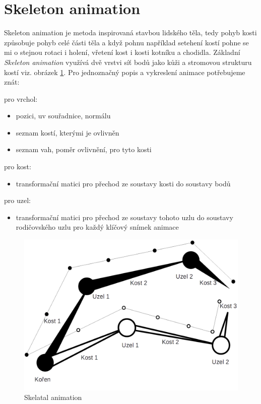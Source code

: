 \section{Skeleton animation}\label{SA}
Skeleton animation je metoda inspirovaná stavbou lidského těla, tedy pohyb kosti způsobuje pohyb celé části těla a když pohnu například setehení kostí pohne se mi o stejnou rotaci i holení, vřetení kost i kosti kotníku a chodidla. Základní \emph{Skeleton animation} využívá dvě vrstvi síť bodů jako kůži a stromovou strukturu kostí viz. obrázek \ref{skeletalAnimation}. Pro jednoznačný popis a vykreslení animace potřebujeme znát:
\begin{itemize}
	\begin{item}
		pro vrchol:
			\begin{itemize}			
			\item pozici, uv souřadnice, normálu
			\item seznam kostí, kterými je ovlivněn
			\item seznam vah, poměr ovlivnění, pro tyto kosti
		\end{itemize}
	\end{item}
	\begin{item}
	pro kost:
	\begin{itemize}
		\item transformační matici pro přechod ze soustavy kosti do soustavy bodů
	\end{itemize}

\end{item}
	\begin{item}
	pro uzel:
	\begin{itemize}
		\item transformační matici pro přechod ze soustavy tohoto uzlu do soustavy rodičovského uzlu pro každý klíčový snímek animace
	\end{itemize}
	
\end{item}
	
\end{itemize}  
\begin{figure}
\begin{center}

\includegraphics[scale=0.33 ]{obrazky-figures/skeletalAnimation}
\caption{Skelatal animation}\label{skeletalAnimation}
\end{center}\end{figure}
